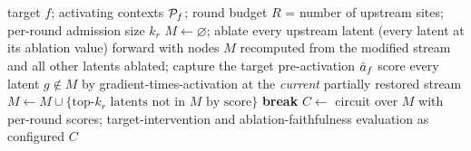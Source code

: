 \documentclass[10pt]{article}
\begin{document}
\begin{algorithm}
\caption{Restoration-mode attribution (one target $f$; \texttt{ig\_restoration} substitutes per-round integrated-gradient scoring in line 4)}
\label{alg:restoration}
\begin{algorithmic}[1]
\Require target $f$; activating contexts $\mathcal{P}_f$; round budget $R$ = number of upstream sites; per-round admission size $k_r$
\State $M \gets \varnothing$; ablate every upstream latent (every latent at its ablation value)
    \State forward with nodes $M$ recomputed from the modified stream and all other latents ablated; capture the target pre-activation $\hat{a}_f$
    \State score every latent $g \notin M$ by gradient-times-activation at the \emph{current} partially restored stream 
    \State $M \gets M \cup \{\text{top-}k_r \text{ latents not in } M \text{ by score}\}$
     \textbf{break} 
    \EndIf
\EndFor
\State $C \gets$ circuit over $M$ with per-round scores; target-intervention and ablation-faithfulness evaluation as configured
\State \Return $C$
\end{algorithmic}
\end{algorithm}
\end{document}
